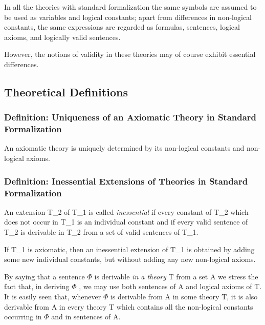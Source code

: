 In all the theories with standard formalization the same symbols are
assumed to be used as variables and logical constants; apart from
differences in non-logical constants, the same expressions are regarded
as formulas, sentences, logical axioms, and logically valid sentences.

However, the notions of validity in these theories may of course exhibit
essential differences.

\hypertarget{theoretical-definitions}{%
\subsection{Theoretical Definitions}\label{theoretical-definitions}}

\hypertarget{definition-uniqueness-of-an-axiomatic-theory-in-standard-formalization}{%
\subsubsection{Definition: Uniqueness of an Axiomatic Theory in Standard
Formalization}\label{definition-uniqueness-of-an-axiomatic-theory-in-standard-formalization}}

An axiomatic theory is uniquely determined by its non-logical constants
and non-logical axioms.

\hypertarget{definition-inessential-extensions-of-theories-in-standard-formalization}{%
\subsubsection{Definition: Inessential Extensions of Theories in
Standard
Formalization}\label{definition-inessential-extensions-of-theories-in-standard-formalization}}

An extension T\_2 of T\_1 is called \emph{inessential} if every constant
of T\_2 which does not occur in T\_1 is an individual constant and if
every valid sentence of T\_2 is derivable in T\_2 from a set of valid
sentences of T\_1.

If T\_1 is axiomatic, then an inessential extension of T\_1 is obtained
by adding some new individual constants, but without adding any new
non-logical axioms.

By saying that a sentence $\Phi$  is derivable \emph{in a theory} T from a set
A we stress the fact that, in deriving $\Phi$ , we may use both sentences of A
and logical axioms of T. It is easily seen that, whenever $\Phi$  is derivable
from A in some theory T, it is also derivable from A in every theory
T\textquotesingle{} which contains all the non-logical constants
occurring in $\Phi$  and in sentences of A.

